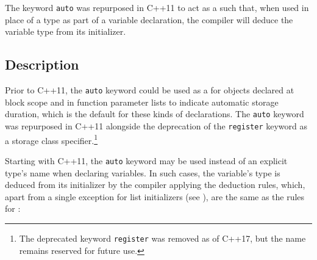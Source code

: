 


\label{auto-variables}
\label{auto-feature}
\setcounter{table}{0}
\setcounter{footnote}{0}
\setcounter{lstlisting}{0}

The keyword \lstinline!auto! was repurposed in C++11 to act as a  such that, when used in place of a type as part of a variable declaration, the compiler will deduce the variable
type from its initializer.

\subsection[Description]{Description}\label{description}

Prior to
C++11, the \lstinline!auto! keyword could be used as a  for objects declared at block scope and in function
parameter lists to indicate automatic storage duration, which is the
default for these kinds of declarations. The \lstinline!auto! keyword was
repurposed in C++11 alongside the deprecation of the \lstinline!register! keyword as a storage class
  specifier.\footnote{The deprecated keyword \lstinline!register! was removed as of C++17, but the name remains reserved for future use.}

  Starting with C++11, the \lstinline!auto! keyword may be used instead of an explicit type's name
when declaring variables. In such cases, the variable's type is deduced
from its initializer by the compiler applying the  deduction rules, which, apart from a single exception for list
initializers (see ),
are the same as the rules for :

